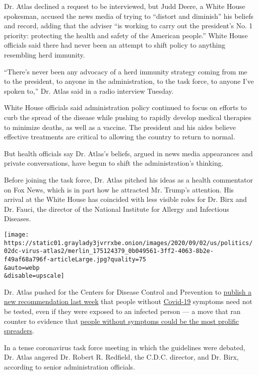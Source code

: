 Dr. Atlas declined a request to be interviewed, but Judd Deere, a White
House spokesman, accused the news media of trying to ``distort and
diminish'' his beliefs and record, adding that the adviser ``is working
to carry out the president's No. 1 priority: protecting the health and
safety of the American people.'' White House officials said there had
never been an attempt to shift policy to anything resembling herd
immunity.

``There's never been any advocacy of a herd immunity strategy coming
from me to the president, to anyone in the administration, to the task
force, to anyone I've spoken to,'' Dr. Atlas said in a radio interview
Tuesday.

White House officials said administration policy continued to focus on
efforts to curb the spread of the disease while pushing to rapidly
develop medical therapies to minimize deaths, as well as a vaccine. The
president and his aides believe effective treatments are critical to
allowing the country to return to normal.

But health officials say Dr. Atlas's beliefs, argued in news media
appearances and private conversations, have begun to shift the
administration's thinking.

Before joining the task force, Dr. Atlas pitched his ideas as a health
commentator on Fox News, which is in part how he attracted Mr. Trump's
attention. His arrival at the White House has coincided with less
visible roles for Dr. Birx and Dr. Fauci, the director of the National
Institute for Allergy and Infectious Diseases.

\texttt{[image: https://static01.graylady3jvrrxbe.onion/images/2020/09/02/us/politics/02dc-virus-atlas2/merlin\_175124379\_0b049561-3ff2-4063-8b2e-f49af68a796f-articleLarge.jpg?quality=75\\\&auto=webp\\\&disable=upscale]}

Dr. Atlas pushed for the Centers for Disease Control and Prevention to
\href{https://www.nytimes3xbfgragh.onion/2020/08/26/us/politics/coronavirus-testing-trump-cdc.html}{publish
a new recommendation last week} that people without
\href{https://www.nytimes3xbfgragh.onion/2020/09/02/health/trump-world-health-organization-coronavirus.html}{Covid-19}
symptoms need not be tested, even if they were exposed to an infected
person --- a move that ran counter to evidence that
\href{https://www.nytimes3xbfgragh.onion/2020/08/06/health/coronavirus-asymptomatic-transmission.html}{people
without symptoms could be the most prolific spreaders}.

In a tense coronavirus task force meeting in which the guidelines were
debated, Dr. Atlas angered Dr. Robert R. Redfield, the C.D.C. director,
and Dr. Birx, according to senior administration officials.

